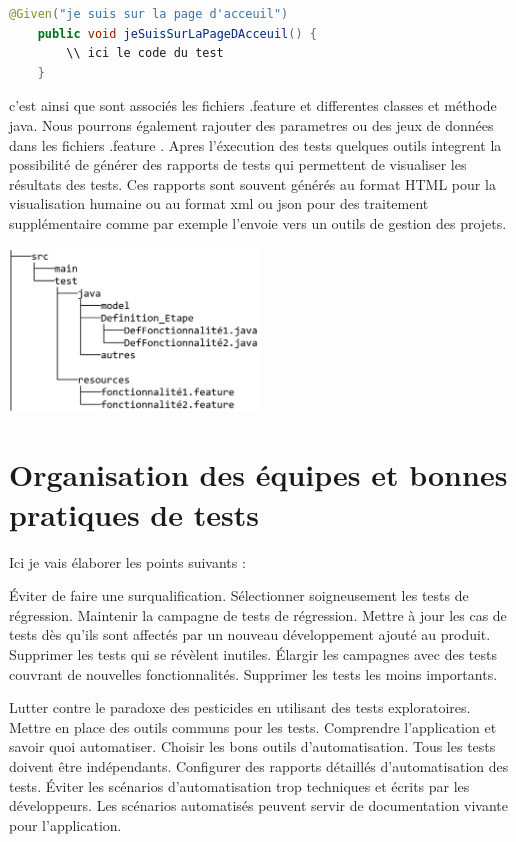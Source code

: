 \begin{lstlisting}[language=Java]
    @Given("je suis sur la page d'acceuil")
    public void jeSuisSurLaPageDAcceuil() {
        \\ ici le code du test
    }
\end{lstlisting}
c'est ainsi que sont associés les fichiers .feature et differentes classes et méthode java.
Nous pourrons également rajouter des parametres ou des jeux de données dans les fichiers .feature \parencite{BddInAction}.
Apres l'éxecution des tests quelques outils integrent la possibilité de générer des rapports de tests qui permettent de visualiser les résultats des tests. Ces rapports sont souvent générés au format HTML pour la visualisation humaine ou au format xml ou json pour des traitement supplémentaire comme par exemple l'envoie vers un outils de gestion des projets.

\begin{center}
    \includegraphics[width=0.5\textwidth]{filetree.png}
    
\end{center}


\section{Organisation des équipes et bonnes pratiques de tests }
\label{sec:organisation}
Ici je vais élaborer les points suivants \parencite{cftl} :


Éviter de faire une surqualification.
Sélectionner soigneusement les tests de régression.
Maintenir la campagne de tests de régression.
Mettre à jour les cas de tests dès qu'ils sont affectés par un nouveau développement ajouté au produit.
Supprimer les tests qui se révèlent inutiles.
Élargir les campagnes avec des tests couvrant de nouvelles fonctionnalités.
Supprimer les tests les moins importants.


Lutter contre le paradoxe des pesticides en utilisant des tests exploratoires.
Mettre en place des outils communs pour les tests.
Comprendre l'application et savoir quoi automatiser.
Choisir les bons outils d'automatisation.
Tous les tests doivent être indépendants.
Configurer des rapports détaillés d'automatisation des tests.
Éviter les scénarios d'automatisation trop techniques et écrits par les développeurs.
Les scénarios automatisés peuvent servir de documentation vivante pour l'application.

